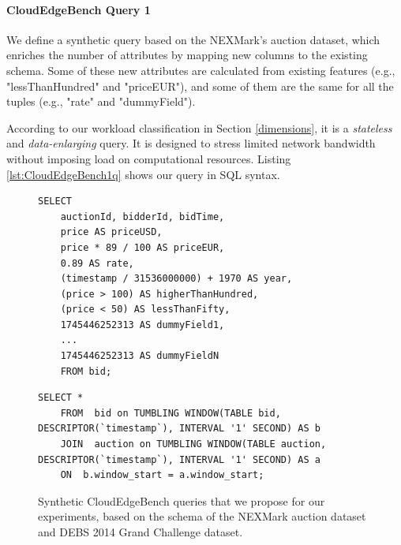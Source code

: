 \documentclass[runningheads]{llncs}
\begin{document}
\paragraph{CloudEdgeBench Query 1}
We define a synthetic query based on the NEXMark's auction dataset, which enriches the number of attributes by mapping new columns to the existing schema.
Some of these new attributes are calculated from existing features (e.g., "lessThanHundred" and "priceEUR"), and some of them are the same for all the tuples (e.g., "rate" and "dummyField").

According to our workload classification in Section \ref{dimensions}, it is a \textit{stateless} and \textit{data-enlarging} query.
It is designed to stress limited network bandwidth without imposing load on computational resources.
Listing \ref{lst:CloudEdgeBench1q} shows our query in SQL syntax.

\begin{figure}
    \centering
    \noindent
    \begin{minipage}[t]{0.48\textwidth}
    \begin{lstlisting}[style=sqlstyle, frame=single, caption={CloudEdgeBench Query 1}, label={lst:CloudEdgeBench1q}]
    SELECT
    auctionId, bidderId, bidTime,
    price AS priceUSD,
    price * 89 / 100 AS priceEUR,
    0.89 AS rate,
    (timestamp / 31536000000) + 1970 AS year,
    (price > 100) AS higherThanHundred,
    (price < 50) AS lessThanFifty,
    1745446252313 AS dummyField1,
    ...
    1745446252313 AS dummyFieldN
    FROM bid;
    \end{lstlisting}
    \end{minipage}\hfill
    \begin{minipage}[t]{0.48\textwidth}
    \begin{lstlisting}[style=sqlstyle, frame=single, caption={CloudEdgeBench Query 2}, label={lst:CloudEdgeBench2q}]
    SELECT *
    FROM  bid on TUMBLING WINDOW(TABLE bid, DESCRIPTOR(`timestamp`), INTERVAL '1' SECOND) AS b
    JOIN  auction on TUMBLING WINDOW(TABLE auction, DESCRIPTOR(`timestamp`), INTERVAL '1' SECOND) AS a
    ON  b.window_start = a.window_start;
    \end{lstlisting}
    \end{minipage}
    \caption{Synthetic CloudEdgeBench queries that we propose for our experiments, based on the schema of the NEXMark auction dataset\cite{nexmark} and DEBS 2014 Grand Challenge dataset\cite{debs2014}.}
\end{figure}
\end{document}

